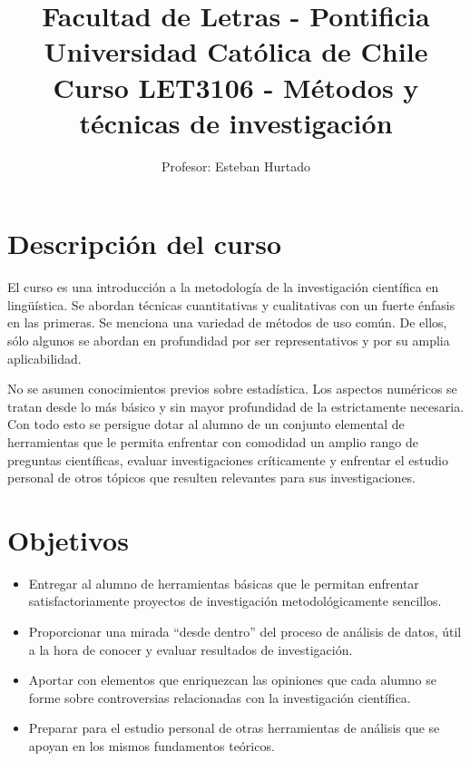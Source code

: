 \documentclass[letterpaper,11pt]{article}
\title{{\Large Facultad de Letras - Pontificia Universidad Católica de Chile } \\ Curso LET3106 - Métodos y técnicas de investigación}
\author{Profesor: Esteban Hurtado}
\begin{document}
\maketitle

\section{Descripci\'on del curso}

El curso es una introducci\'on a la metodolog\'ia de la investigaci\'on cient\'ifica en ling\"u\'istica. Se abordan t\'ecnicas cuantitativas y cualitativas con un fuerte \'enfasis en las primeras. Se menciona una variedad de m\'etodos de uso común. De ellos, s\'olo algunos se abordan en profundidad por ser representativos y por su amplia aplicabilidad. 

No se asumen conocimientos previos sobre estad\'istica. Los aspectos num\'ericos se tratan desde lo m\'as b\'asico y sin mayor profundidad de la estrictamente necesaria. Con todo esto se persigue dotar al alumno de un conjunto elemental de herramientas que le permita enfrentar con comodidad un amplio rango de preguntas cient\'ificas, evaluar investigaciones cr\'iticamente y enfrentar el estudio personal de otros t\'opicos que resulten relevantes para sus investigaciones.

\section{Objetivos}

\begin{itemize}
  \item Entregar al alumno de herramientas b\'asicas que le permitan enfrentar satisfactoriamente proyectos de investigaci\'on metodol\'ogicamente sencillos.
    
  \item Proporcionar una mirada ``desde dentro'' del proceso de análisis de datos, útil a la hora de conocer y evaluar resultados de investigación.

  \item Aportar con elementos que enriquezcan las opiniones que cada alumno se forme sobre controversias relacionadas con la investigaci\'on cient\'ifica.
  
  \item Preparar para el estudio personal de otras herramientas de análisis que se apoyan en los mismos fundamentos teóricos. 
  
\end{itemize}
\end{document}
